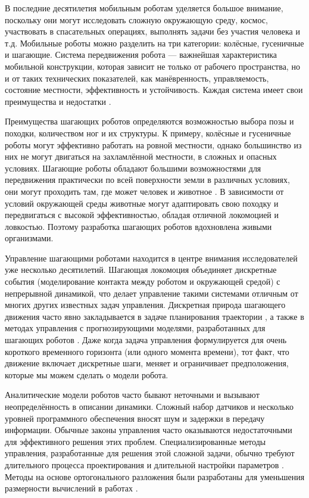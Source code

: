 {\actuality} 

В последние десятилетия мобильным роботам уделяется большое внимание, поскольку они могут исследовать сложную окружающую среду, космос, участвовать в спасательных операциях, выполнять задачи без участия человека и т.д. Мобильные роботы можно разделить на три категории: колёсные, гусеничные и шагающие. Система передвижения робота --- важнейшая характеристика мобильной конструкции, которая зависит не только от рабочего пространства, но и от таких технических показателей, как манёвренность, управляемость, состояние местности, эффективность и устойчивость. Каждая система имеет свои преимущества и недостатки \cite{zhong2019}.

Преимущества шагающих роботов определяются возможностью выбора позы и походки, количеством ног и их структуры. К примеру, колёсные и гусеничные роботы могут эффективно работать на ровной местности, однако большинство из них не могут двигаться на захламлённой местности, в сложных и опасных условиях. Шагающие роботы обладают большими возможностями для передвижения практически по всей поверхности земли в различных условиях, они могут проходить там, где может человек и животное \cite{Silva2012}. В зависимости от условий окружающей среды животные могут адаптировать свою походку и передвигаться с высокой эффективностью, обладая отличной локомоцией и ловкостью. Поэтому разработка шагающих роботов вдохновлена живыми организмами.

Управление шагающими роботами находится в центре внимания исследователей уже несколько десятилетий. Шагающая локомоция объединяет дискретные события (моделирование контакта между роботом и окружающей средой) с непрерывной динамикой, что делает управление такими системами отличным от многих других известных задач управления. Дискретная природа шагающего движения часто явно закладывается в задаче планирования траектории \cite{katayama2022whole, lu2023whole}, а также в методах управления с прогнозирующими моделями, разработанных для шагающих роботов \cite{KIM2019, chignoli2021humanoid}. Даже когда задача управления формулируется для очень короткого временного горизонта (или одного момента времени), тот факт, что движение включает дискретные шаги, меняет и ограничивает предположения, которые мы можем сделать о модели робота.

Аналитические модели роботов часто бывают неточными и вызывают неопределённость в описании динамики. Сложный набор датчиков и несколько уровней программного обеспечения вносят шум и задержки в передачу информации. Обычные законы управления часто оказываются недостаточными для эффективного решения этих проблем. Специализированные методы управления, разработанные для решения этой сложной задачи, обычно требуют длительного процесса проектирования и длительной настройки параметров \cite{underactuated}. Методы на основе ортогонального разложения были разработаны для уменьшения размерности вычислений в работах \cite{Schur, mason2014full}.

